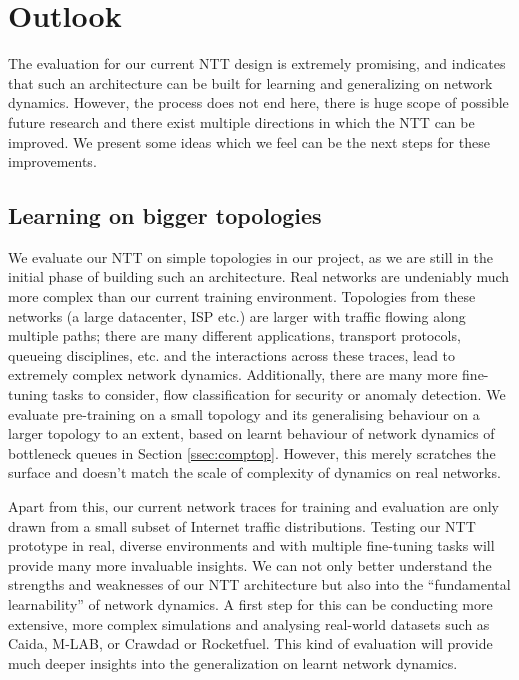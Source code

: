 \chapter{Outlook}
\label{cha:outlook}

The evaluation for our current NTT design is extremely promising, and indicates that such an architecture can be built for learning and generalizing on network dynamics. However, the process does not end here, there is huge scope of possible future research and there exist multiple directions in which the NTT can be improved. We present some ideas which we feel can be the next steps for these improvements.

\section{Learning on bigger topologies}
\label{sec:biggertopos}

We evaluate our NTT on simple topologies in our project, as we are still in the initial phase of building such an architecture. Real networks are undeniably much more complex than our current training environment. Topologies from these networks (\eg a large datacenter, ISP etc.) are larger with traffic flowing along multiple paths; there are many different applications, transport protocols, queueing disciplines, etc. and the interactions across these traces, lead to extremely complex network dynamics. Additionally, there are many more fine-tuning tasks to consider, \eg flow classification for security or anomaly detection. We evaluate pre-training on a small topology and its generalising behaviour on a larger topology to an extent, based on learnt behaviour of network dynamics of bottleneck queues in Section \ref{ssec:comptop}. However, this merely scratches the surface and doesn't match the scale of complexity of dynamics on real networks. 

Apart from this, our current network traces for training and evaluation are only drawn from a small subset of Internet traffic distributions\cite{homa}. Testing our NTT prototype in real, diverse environments and with multiple fine-tuning tasks will provide many more invaluable insights. We can not only better understand the strengths and weaknesses of our NTT architecture but also into the ``fundamental learnability'' of network dynamics. A first step for this can be conducting more extensive, more complex simulations and analysing real-world datasets such as Caida\cite{caida}, M-LAB\cite{mlab}, or Crawdad\cite{crawdad} or Rocketfuel\cite{rocketfuel}. This kind of evaluation will provide much deeper insights into the generalization on learnt network dynamics.

